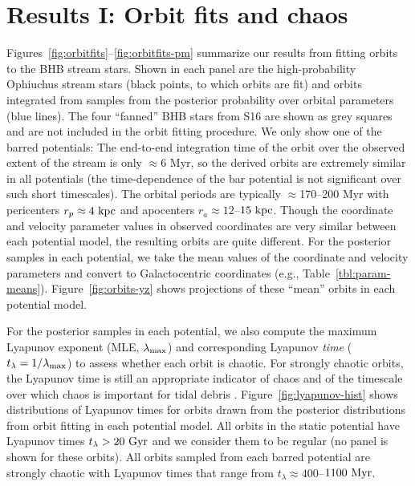 \documentclass[letterpaper,12pt,preprint]{aastex}
\newcommand{\lyapexp}{\lambda_{\rm max}}
\newcommand{\lyapt}{t_\lambda}
\begin{document}
\section{Results I: Orbit fits and chaos}\label{sec:results1}

Figures~\ref{fig:orbitfits}--\ref{fig:orbitfits-pm} summarize our results from fitting orbits to the BHB stream stars. Shown in each panel are the high-probability Ophiuchus stream stars (black points, to which orbits are fit) and orbits integrated from samples from the posterior probability over orbital parameters (blue lines). The four ``fanned'' BHB stars from S16 are shown as grey squares and are not included in the orbit fitting procedure. We only show one of the barred potentials: The end-to-end integration time of the orbit over the observed extent of the stream is only $\approx$6 Myr, so the derived orbits are extremely similar in all potentials (the time-dependence of the bar potential is not significant over such short timescales).  The orbital periods are typically $\approx$170--200 Myr with pericenters $r_p \approx 4~{\rm kpc}$ and apocenters $r_a \approx 12$--$15~{\rm kpc}$. Though the coordinate and velocity parameter values in observed coordinates are very similar between each potential model, the resulting orbits are quite different. For the posterior samples in each potential, we take the mean values of the coordinate and velocity parameters and convert to Galactocentric coordinates (e.g., Table~\ref{tbl:param-means}). Figure~\ref{fig:orbits-yz} shows projections of these ``mean'' orbits in each potential model.

For the posterior samples in each potential, we also compute the maximum Lyapunov exponent (MLE, $\lyapexp$) and corresponding Lyapunov \emph{time} ($\lyapt = 1/\lyapexp$) to assess whether each orbit is chaotic. For strongly chaotic orbits, the Lyapunov time is still an appropriate indicator of chaos and of the timescale over which chaos is important for tidal debris \citep{apw15-chaos}. Figure~\ref{fig:lyapunov-hist} shows distributions of Lyapunov times for orbits drawn from the posterior distributions from orbit fitting in each potential model. All orbits in the static potential have Lyapunov times $\lyapt > 20~{\rm Gyr}$ and we consider them to be regular (no panel is shown for these orbits). All orbits sampled from each barred potential are strongly chaotic with Lyapunov times that range from $\lyapt \approx 400$--$1100~{\rm Myr}$. 
\end{document}
